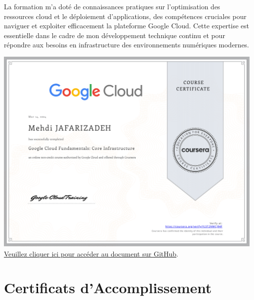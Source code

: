 \documentclass{article}
\begin{document}
    La formation m'a doté de connaissances pratiques sur l'optimisation des ressources cloud et le déploiement d'applications, des compétences cruciales pour naviguer et exploiter efficacement la plateforme Google Cloud. Cette expertise est essentielle dans le cadre de mon développement technique continu et pour répondre aux besoins en infrastructure des environnements numériques modernes.
    \newline
    \newline
    \begin{center}
            \includegraphics[width=\textwidth,height=\textheight,keepaspectratio]{../Document/Certificats de Fin de Cours/Google Cloud Fundamentals Core Infrastructure/Google Cloud Fundamentals Core Infrastructure.pdf}
            \footnotesize
             \href{https://github.com/jafarizadeh/CV---lettre/tree/00df58c41988ba7488536512caee235bdb5d570d/Document/Certificats%20de%20Fin%20de%20Cours/Google%20Cloud%20Fundamentals%20Core%20Infrastructure}{Veuillez cliquer ici pour accéder au document sur GitHub}.
        \end{center}

    \newpage



\section{Certificats d'Accomplissement}
\end{document}
